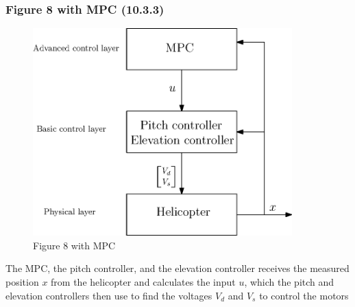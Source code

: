 \subsubsection{Figure 8 with MPC (10.3.3)}
\begin{figure}[H]
	\centering
	\includegraphics[width=10cm]{figurate_with_MPC}
	\caption{Figure 8 with MPC}
	\label{fig:figurate}
\end{figure}

The MPC, the pitch controller, and the elevation controller receives the measured position $x$ from the helicopter and calculates the input $u$, which the pitch and elevation controllers then use to find the voltages $V_d$ and $V_s$ to control the motors
